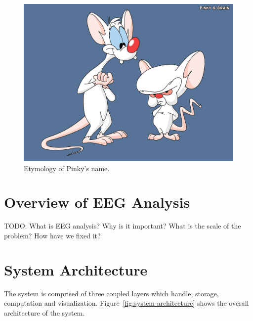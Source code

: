 \begin{figure}[h]
\begin{center}
\includegraphics[scale=0.5]{./img/pinky-and-the-brain.png}
\caption{Etymology of Pinky's name.}
\label{fig:pinky-and-the-brain}
\end{center}
\end{figure}

\section{Overview of EEG Analysis}

TODO:
What is EEG analysis? Why is it important? What is the scale of the problem? How have we fixed it?

\section{System Architecture}

The system is comprised of three coupled layers which handle, storage,
computation and visualization. Figure~\ref{fig:system-architecture} shows the
overall architecture of the system.

